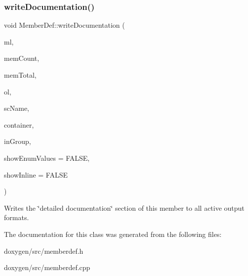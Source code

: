 \subsubsection{\texorpdfstring{writeDocumentation()}{writeDocumentation()}}
{\footnotesize\ttfamily void Member\+Def\+::write\+Documentation (\begin{DoxyParamCaption}\item[{\mbox{\hyperlink{class_member_list}{Member\+List}} $\ast$}]{ml,  }\item[{int}]{mem\+Count,  }\item[{int}]{mem\+Total,  }\item[{\mbox{\hyperlink{class_output_list}{Output\+List}} \&}]{ol,  }\item[{const char $\ast$}]{sc\+Name,  }\item[{\mbox{\hyperlink{class_definition}{Definition}} $\ast$}]{container,  }\item[{bool}]{in\+Group,  }\item[{bool}]{show\+Enum\+Values = {\ttfamily FALSE},  }\item[{bool}]{show\+Inline = {\ttfamily FALSE} }\end{DoxyParamCaption})}

Writes the \char`\"{}detailed documentation\char`\"{} section of this member to all active output formats. 

The documentation for this class was generated from the following files\+:\begin{DoxyCompactItemize}
\item 
doxygen/src/memberdef.\+h\item 
doxygen/src/memberdef.\+cpp\end{DoxyCompactItemize}
